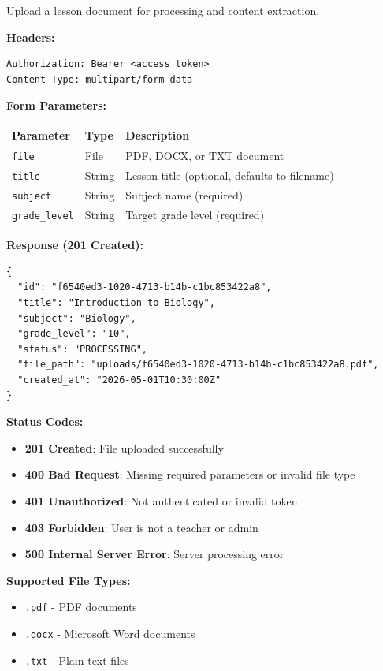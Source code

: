 \documentclass[12pt,a4paper,oneside]{article}
\begin{document}
Upload a lesson document for processing and content extraction.

\textbf{Headers:}
\begin{lstlisting}
Authorization: Bearer <access_token>
Content-Type: multipart/form-data
\end{lstlisting}

\textbf{Form Parameters:}
\begin{table}[H]
\centering
\begin{tabular}{|l|l|l|}
\hline
\textbf{Parameter} & \textbf{Type} & \textbf{Description} \\
\hline
\texttt{file} & File & PDF, DOCX, or TXT document \\
\texttt{title} & String & Lesson title (optional, defaults to filename) \\
\texttt{subject} & String & Subject name (required) \\
\texttt{grade\_level} & String & Target grade level (required) \\
\hline
\end{tabular}
\end{table}

\textbf{Response (201 Created):}
\begin{lstlisting}
{
  "id": "f6540ed3-1020-4713-b14b-c1bc853422a8",
  "title": "Introduction to Biology",
  "subject": "Biology",
  "grade_level": "10",
  "status": "PROCESSING",
  "file_path": "uploads/f6540ed3-1020-4713-b14b-c1bc853422a8.pdf",
  "created_at": "2026-05-01T10:30:00Z"
}
\end{lstlisting}

\textbf{Status Codes:}
\begin{itemize}
    \item \textbf{201 Created}: File uploaded successfully
    \item \textbf{400 Bad Request}: Missing required parameters or invalid file type
    \item \textbf{401 Unauthorized}: Not authenticated or invalid token
    \item \textbf{403 Forbidden}: User is not a teacher or admin
    \item \textbf{500 Internal Server Error}: Server processing error
\end{itemize}

\textbf{Supported File Types:}
\begin{itemize}
    \item \texttt{.pdf} - PDF documents
    \item \texttt{.docx} - Microsoft Word documents
    \item \texttt{.txt} - Plain text files
\end{itemize}
\end{document}
